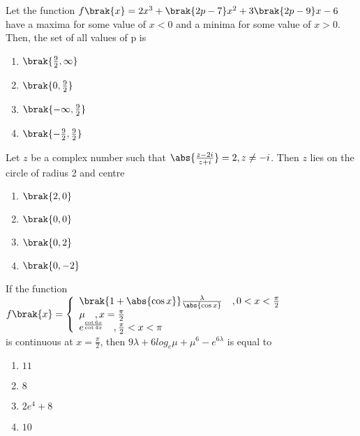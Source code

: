 
\iffalse
  \title{2023}
  \author{EE24BTECH11032}
  \section{mcq-single}
\fi

        \item Let the function $f\brak{x}=2x^3+\brak{2p-7}x^2+3\brak{2p-9}x-6$ have a maxima for some value of $x<0$ and a minima for some value of $x>0$. Then, the set of all values of p is \hfill{}
    \begin{enumerate}
        \item $\brak{\frac{9}{2},\infty}$
        \item $\brak{0,\frac{9}{2}}$
        \item $\brak{-\infty,\frac{9}{2}}$
        \item $\brak{-\frac{9}{2},\frac{9}{2}}$
    \end{enumerate}
    \item Let $z$ be a complex number such that $\abs{\frac{z-2i}{z+i}}=2,z\neq-i$. Then $z$ lies on the circle of radius 2 and centre \hfill{}
    \begin{enumerate}
        \item $\brak{2,0}$
        \item $\brak{0,0}$
        \item $\brak{0,2}$
        \item $\brak{0,-2}$
    \end{enumerate}
    \item If the function \\
    $f\brak{x}=\left\{ \begin{array}{ll} \brak{1+\abs{\cos{x}}}\frac{\lambda}{\abs{\cos{x}}} \quad ,0<x < \frac{\pi}{2} \\ \mu \quad, x=\frac{\pi}{2} \\ e^{\frac{\cot6x}{\cot4x}} \quad ,\frac{\pi}{2}<x<\pi \end{array} \right. $\\
    is continuous at
    $x=\frac{\pi}{2}$, then $9\lambda+6log_e\mu+\mu^6-e^{6\lambda}$ is equal to \hfill{}
    \begin{enumerate}
        \item $11$
        \item $8$
        \item $2e^4+8$
        \item $10$
    \end{enumerate}
